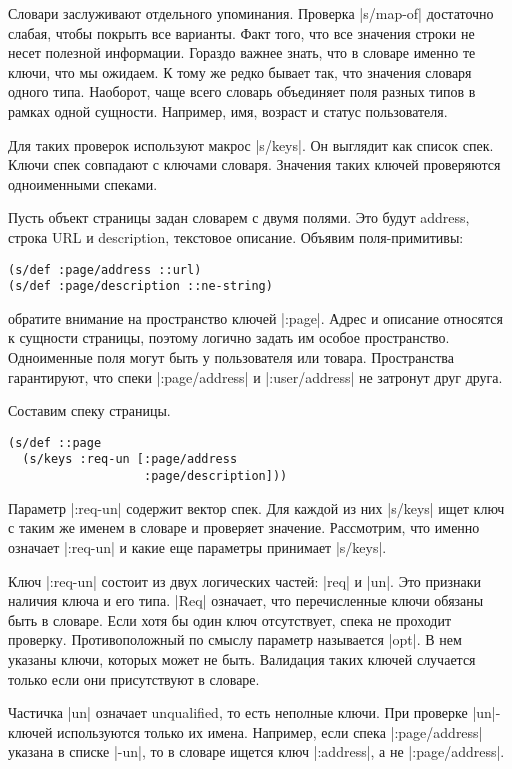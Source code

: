 Словари заслуживают отдельного упоминания. Проверка \spverb|s/map-of| достаточно
слабая, чтобы покрыть все варианты. Факт того, что все значения строки не несет
полезной информации. Гораздо важнее знать, что в словаре именно те ключи, что мы
ожидаем. К тому же редко бывает так, что значения словаря одного типа. Наоборот,
чаще всего словарь объединяет поля разных типов в рамках одной
сущности. Например, имя, возраст и статус пользователя.

Для таких проверок используют макрос \spverb|s/keys|. Он выглядит как список
спек. Ключи спек совпадают с ключами словаря. Значения таких ключей проверяются
одноименными спеками.

Пусть объект страницы задан словарем с двумя полями. Это будут address, строка
URL и description, текстовое описание. Объявим поля-примитивы:

\begin{verbatim}
(s/def :page/address ::url)
(s/def :page/description ::ne-string)
\end{verbatim}

обратите внимание на пространство ключей \spverb|:page|. Адрес и описание относятся к
сущности страницы, поэтому логично задать им особое пространство. Одноименные
поля могут быть у пользователя или товара. Пространства гарантируют, что спеки
\spverb|:page/address| и \spverb|:user/address| не затронут друг друга.

Составим спеку страницы.

\begin{verbatim}
(s/def ::page
  (s/keys :req-un [:page/address
                   :page/description]))
\end{verbatim}

Параметр \spverb|:req-un| содержит вектор спек. Для каждой из них \spverb|s/keys| ищет ключ с
таким же именем в словаре и проверяет значение. Рассмотрим, что именно означает
\spverb|:req-un| и какие еще параметры принимает \spverb|s/keys|.

Ключ \spverb|:req-un| состоит из двух логических частей: \spverb|req| и \spverb|un|. Это признаки
наличия ключа и его типа. \spverb|Req| означает, что перечисленные ключи обязаны быть в
словаре. Если хотя бы один ключ отсутствует, спека не проходит
проверку. Противоположный по смыслу параметр называется \spverb|opt|. В нем указаны
ключи, которых может не быть. Валидация таких ключей случается только если они
присутствуют в словаре.

Частичка \spverb|un| означает unqualified, то есть неполные ключи. При проверке
\spverb|un|-ключей используются только их имена. Например, если спека \spverb|:page/address|
указана в списке \spverb|-un|, то в словаре ищется ключ \spverb|:address|, а не
\spverb|:page/address|.

